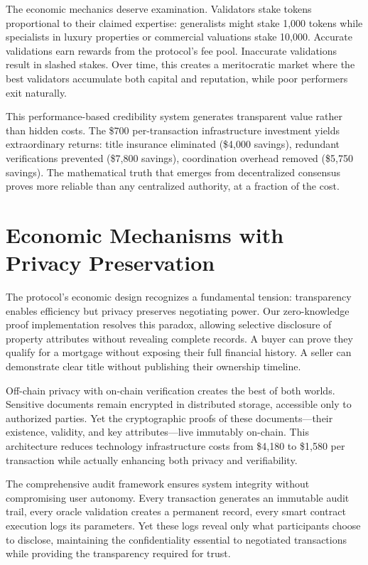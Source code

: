 The economic mechanics deserve examination. Validators stake tokens proportional to their claimed expertise: generalists might stake 1{,}000 tokens while specialists in luxury properties or commercial valuations stake 10{,}000. Accurate validations earn rewards from the protocol's fee pool. Inaccurate validations result in slashed stakes. Over time, this creates a meritocratic market where the best validators accumulate both capital and reputation, while poor performers exit naturally.

This performance-based credibility system generates transparent value rather than hidden costs. The \$700 per-transaction infrastructure investment yields extraordinary returns: title insurance eliminated (\$4{,}000 savings), redundant verifications prevented (\$7{,}800 savings), coordination overhead removed (\$5{,}750 savings). The mathematical truth that emerges from decentralized consensus proves more reliable than any centralized authority, at a fraction of the cost.

\section{Economic Mechanisms with Privacy Preservation}

The protocol's economic design recognizes a fundamental tension: transparency enables efficiency but privacy preserves negotiating power. Our zero-knowledge proof implementation resolves this paradox, allowing selective disclosure of property attributes without revealing complete records. A buyer can prove they qualify for a mortgage without exposing their full financial history. A seller can demonstrate clear title without publishing their ownership timeline.

Off-chain privacy with on-chain verification creates the best of both worlds. Sensitive documents remain encrypted in distributed storage, accessible only to authorized parties. Yet the cryptographic proofs of these documents—their existence, validity, and key attributes—live immutably on-chain. This architecture reduces technology infrastructure costs from \$4{,}180 to \$1{,}580 per transaction while actually enhancing both privacy and verifiability.

The comprehensive audit framework ensures system integrity without compromising user autonomy. Every transaction generates an immutable audit trail, every oracle validation creates a permanent record, every smart contract execution logs its parameters. Yet these logs reveal only what participants choose to disclose, maintaining the confidentiality essential to negotiated transactions while providing the transparency required for trust.

